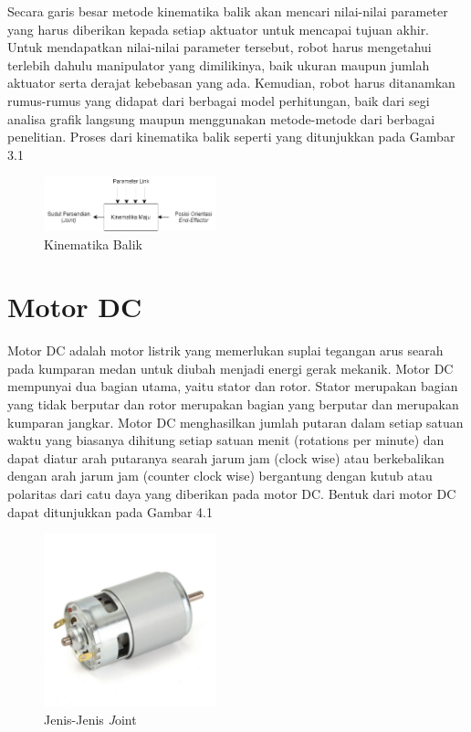 Secara garis besar metode kinematika balik akan mencari nilai-nilai parameter yang harus diberikan kepada setiap aktuator untuk mencapai tujuan akhir. Untuk mendapatkan nilai-nilai parameter tersebut, robot harus mengetahui terlebih dahulu manipulator yang dimilikinya, baik ukuran maupun jumlah aktuator serta derajat kebebasan yang ada. Kemudian, robot harus ditanamkan rumus-rumus yang didapat dari berbagai model perhitungan, baik dari segi analisa grafik langsung maupun menggunakan metode-metode dari berbagai penelitian. Proses dari kinematika balik seperti yang ditunjukkan pada Gambar 3.1

	\begin{figure}[H]
	\centering
	\includegraphics[width=5cm]{gambar/kinematika_balik.png}
	\caption{Kinematika Balik}
\end{figure}

\section{Motor DC}
Motor DC adalah motor listrik yang memerlukan suplai tegangan arus searah pada kumparan medan untuk diubah menjadi energi gerak mekanik. Motor DC mempunyai dua bagian utama, yaitu stator dan rotor. Stator merupakan bagian yang tidak berputar dan rotor merupakan bagian yang berputar dan merupakan kumparan jangkar. Motor DC menghasilkan jumlah putaran dalam setiap satuan waktu yang biasanya dihitung setiap satuan menit (rotations per minute) dan dapat diatur arah putaranya searah jarum jam (clock wise) atau berkebalikan dengan arah jarum jam (counter clock wise) bergantung dengan kutub atau polaritas dari catu daya yang diberikan pada motor DC. Bentuk dari motor DC dapat ditunjukkan pada Gambar 4.1
	\begin{figure}[H]
	\centering
	\includegraphics[width=5cm]{gambar/motorDC.jpeg}
	\caption{Jenis-Jenis \emph Joint}
\end{figure}


